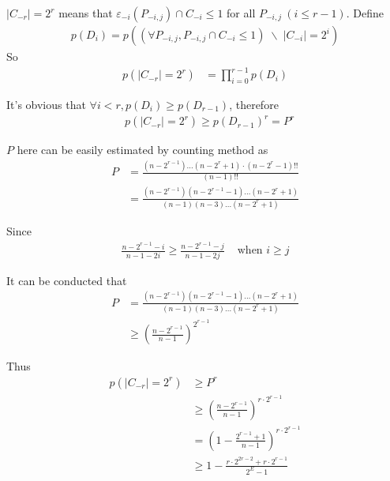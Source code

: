 \documentclass[10pt, conference, compsocconf]{IEEEtran}
\begin{document}
        \begin{IEEEproof}
            $|C_{-r}| = 2^r$ means that $\varepsilon_{-i}(P_{-i, j}) \cap C_{-i} \leq 1$
            for all $P_{-i, j}~(i \leq r-1)$. Define
            \begin{align*}
                p(D_i) = p\left((\forall P_{-i, j}, P_{-i, j} \cap C_{-i} \leq 1)
                     \; \backslash \; |C_{-i}| = 2^i\right)
            \end{align*}
            So
            \begin{align*}
                p(|C_{-r}| = 2^r) &= \prod_{i=0}^{r-1} p(D_i)
            \end{align*}

            It's obvious that $\forall i < r, p(D_i) \geq p(D_{r-1})$, therefore
            \begin{align*}
                &p(|C_{-r}| = 2^r)
                \geq p(D_{r-1})^r
                = P^r
            \end{align*}

            $P$ here can be easily estimated by counting method as
            \begin{align*}
                P &= \frac{(n-2^{r-1})\ldots(n-2^r+1)\cdot (n-2^r-1)!!}{(n-1)!!}\\
                    &= \frac{(n-2^{r-1})(n-2^{r-1}-1)\ldots (n-2^r+1)}{(n-1)(n-3)\ldots(n-2^r+1)}
            \end{align*}

            Since
            \begin{align*}
                \frac{n-2^{r-1}-i}{n-1-2i} \geq \frac{n-2^{r-1}-j}{n-1-2j} & \text{ when } i \geq j
            \end{align*}

            It can be conducted that
            \begin{align*}
                P &= \frac{(n-2^{r-1})(n-2^{r-1}-1)\ldots (n-2^r+1)}{(n-1)(n-3)\ldots(n-2^r+1)}\\
                    &\geq (\frac{n-2^{r-1}}{n-1})^{2^{r-1}}
            \end{align*}

            Thus
            \begin{align*}
            p(|C_{-r}| = 2^r) &\geq P^r\\
                &\geq (\frac{n-2^{r-1}}{n-1})^{r \cdot 2^{r-1}}\\
                &= (1-\frac{2^{r-1}+1}{n-1})^{r \cdot 2^{r-1}}\\
                &\geq 1-\frac{r \cdot 2^{2r-2}+r \cdot 2^{r-1}}{2^E-1}
            \end{align*}
        \end{IEEEproof}
\end{document}
